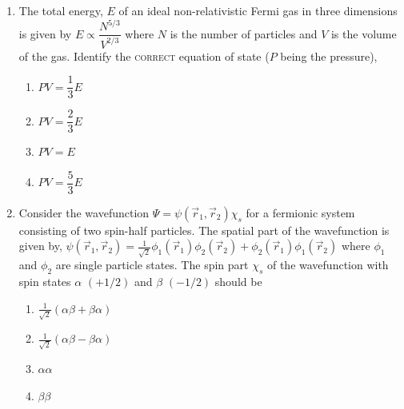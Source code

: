\documentclass[journal,12pt,onecolumn]{IEEEtran}
\theoremstyle{remark}
\begin{document}
\begin{enumerate}
\item The total energy, $E$ of an ideal non-relativistic Fermi gas in three dimensions is given by
$
E \propto \dfrac{N^{5/3}}{V^{2/3}}
$
where $N$ is the number of particles and $V$ is the volume of the gas. Identify the \textsc{correct} equation of state ($P$ being the pressure),
\begin{multicols}{4}
\begin{enumerate}
\item $PV = \dfrac{1}{3}E$
\item $PV = \dfrac{2}{3}E$
\item $PV = E$
\item $PV = \dfrac{5}{3}E$
\end{enumerate}
\end{multicols}

\item Consider the wavefunction $\Psi = \psi(\vec{r}_1, \vec{r}_2)\chi_s$ for a fermionic system consisting of two spin-half particles. The spatial part of the wavefunction is given by,
$
\psi(\vec{r}_1, \vec{r}_2) = \frac{1}{\sqrt{2}}  \phi_{1}(\vec{r}_1)\phi_{2}(\vec{r}_2) + \phi_{2}(\vec{r}_1)\phi_{1}(\vec{r}_2) $
where $\phi_1$ and $\phi_2$ are single particle states. The spin part $\chi_s$ of the wavefunction with spin states $\alpha$ $(+{1}/{2})$ and $\beta$ $(-{1}/{2})$ should be
\begin{multicols}{4}
\begin{enumerate}
\item $\tfrac{1}{\sqrt{2}} (\alpha\beta + \beta\alpha)$
\item $\tfrac{1}{\sqrt{2}} (\alpha\beta - \beta\alpha)$
\item $\alpha\alpha$
\item $\beta\beta$
\end{enumerate}
\end{multicols}


\end{enumerate}
\end{document}
